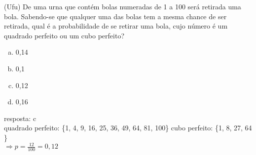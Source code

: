\begin{ex}
(Ufu) De uma urna que contém bolas numeradas de 1 a 100 será retirada uma bola. Sabendo-se que qualquer uma das bolas tem a mesma chance de ser retirada, qual é a probabilidade de se retirar uma bola, cujo número é um quadrado perfeito ou um cubo perfeito?
   \begin{enumerate}[(a)]
   \item 0,14
   \item 0,1
   \item 0,12
   \item 0,16
   \end{enumerate}
     \begin{sol}
      resposta: c\\
      quadrado perfeito: \{1, 4, 9, 16, 25, 36, 49, 64, 81, 100\} \hspace{0,3cm} cubo perfeito: \{1, 8, 27, 64 \} \\
      $\Longrightarrow p= \frac{12}{100}=0,12$
     \end{sol}
\end{ex}